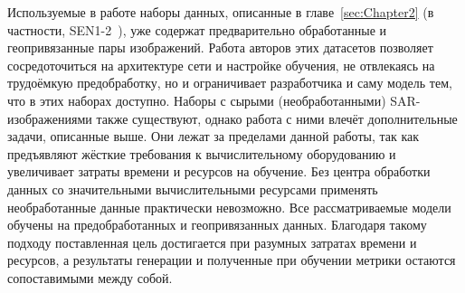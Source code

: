 Используемые в работе наборы данных, описанные в главе~\ref{sec:Chapter2} (в частности, SEN1-2~\cite{schmitt2018sen1}), уже содержат предварительно обработанные и геопривязанные пары изображений.
Работа авторов этих датасетов позволяет сосредоточиться на архитектуре сети и настройке обучения, не отвлекаясь на трудоёмкую предобработку, но и ограничивает разработчика и саму модель тем, что в этих наборах доступно.
Наборы с сырыми (необработанными) SAR-изображениями также существуют, однако работа с ними влечёт дополнительные задачи, описанные выше.
Они лежат за пределами данной работы, так как предъявляют жёсткие требования к вычислительному оборудованию и увеличивает затраты времени и ресурсов на обучение.
Без центра обработки данных со значительными вычислительными ресурсами применять необработанные данные практически невозможно.
Все рассматриваемые модели обучены на предобработанных и геопривязанных данных. Благодаря такому подходу поставленная цель достигается при разумных затратах времени и ресурсов, а результаты генерации и полученные при обучении метрики остаются сопоставимыми между собой.

\newpage